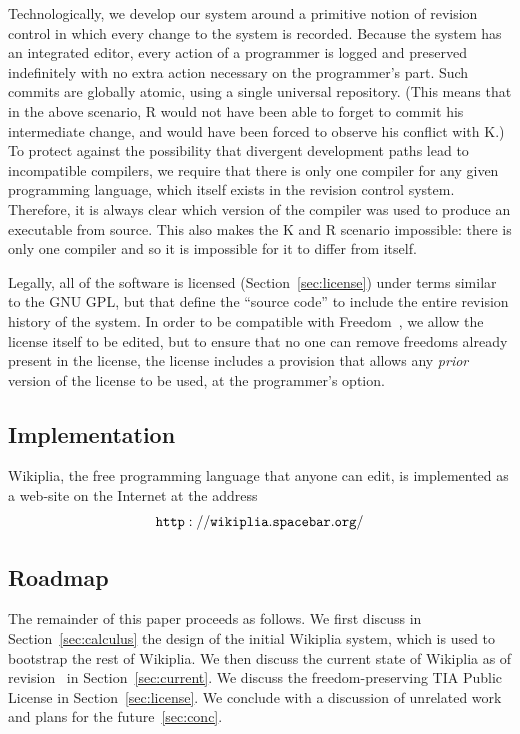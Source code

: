 \documentclass[twocolumn]{article}
\begin{document}
Technologically, we develop our system around a primitive notion of
revision control in which every change to the system is recorded.
Because the system has an integrated editor, every action of a
programmer is logged and preserved indefinitely with no extra action
necessary on the programmer's part. Such commits are globally atomic,
using a single universal repository. (This means that in the above
scenario, R would not have been able to forget to commit his
intermediate change, and would have been forced to observe his
conflict with K.) To protect against the possibility that divergent
development paths lead to incompatible compilers, we require that
there is only one compiler for any given programming language, which
itself exists in the revision control system. Therefore, it is always
clear which version of the compiler was used to produce an executable
from source. This also makes the K and R scenario impossible: there is
only one compiler and so it is impossible for it to differ from
itself.

Legally, all of the software is licensed (Section~\ref{sec:license})
under terms similar to the GNU GPL, but that define the ``source
code'' to include the entire revision history of the system. In order
to be compatible with Freedom~\ffree, we allow the license itself to be
edited, but to ensure that no one can remove freedoms already present
in the license, the license includes a provision that allows any {\em
prior} version of the license to be used, at the programmer's option.

\subsection{Implementation}

Wikiplia, the free programming language that anyone can edit, is
implemented as a web-site on the Internet at the address
$${\tt http://wikiplia.spacebar.org/}$$

\subsection{Roadmap}

The remainder of this paper proceeds as follows. We first discuss in
Section~\ref{sec:calculus} the design of the initial Wikiplia system,
which is used to bootstrap the rest of Wikiplia. We then discuss the
current state of Wikiplia as of revision \currentrevision\ in
Section~\ref{sec:current}. We discuss the freedom-preserving TIA
Public License in Section~\ref{sec:license}. We conclude with a
discussion of unrelated work and plans for the future~\ref{sec:conc}.
\end{document}

